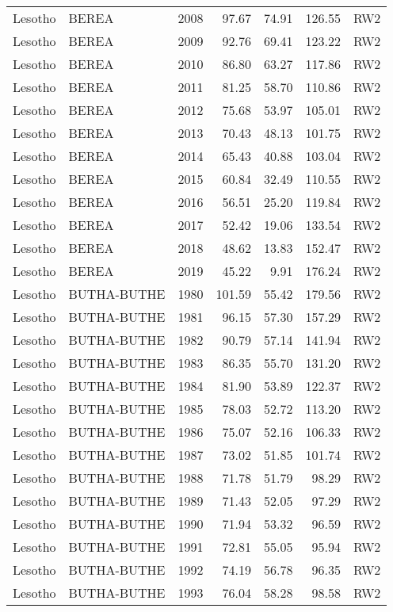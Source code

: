 \begin{longtable}{lllrrrl}
  Lesotho & BEREA & 2008 & 97.67 & 74.91 & 126.55 & RW2 \\ 
  Lesotho & BEREA & 2009 & 92.76 & 69.41 & 123.22 & RW2 \\ 
  Lesotho & BEREA & 2010 & 86.80 & 63.27 & 117.86 & RW2 \\ 
  Lesotho & BEREA & 2011 & 81.25 & 58.70 & 110.86 & RW2 \\ 
  Lesotho & BEREA & 2012 & 75.68 & 53.97 & 105.01 & RW2 \\ 
  Lesotho & BEREA & 2013 & 70.43 & 48.13 & 101.75 & RW2 \\ 
  Lesotho & BEREA & 2014 & 65.43 & 40.88 & 103.04 & RW2 \\ 
  Lesotho & BEREA & 2015 & 60.84 & 32.49 & 110.55 & RW2 \\ 
  Lesotho & BEREA & 2016 & 56.51 & 25.20 & 119.84 & RW2 \\ 
  Lesotho & BEREA & 2017 & 52.42 & 19.06 & 133.54 & RW2 \\ 
  Lesotho & BEREA & 2018 & 48.62 & 13.83 & 152.47 & RW2 \\ 
  Lesotho & BEREA & 2019 & 45.22 & 9.91 & 176.24 & RW2 \\ 
  Lesotho & BUTHA-BUTHE & 1980 & 101.59 & 55.42 & 179.56 & RW2 \\ 
  Lesotho & BUTHA-BUTHE & 1981 & 96.15 & 57.30 & 157.29 & RW2 \\ 
  Lesotho & BUTHA-BUTHE & 1982 & 90.79 & 57.14 & 141.94 & RW2 \\ 
  Lesotho & BUTHA-BUTHE & 1983 & 86.35 & 55.70 & 131.20 & RW2 \\ 
  Lesotho & BUTHA-BUTHE & 1984 & 81.90 & 53.89 & 122.37 & RW2 \\ 
  Lesotho & BUTHA-BUTHE & 1985 & 78.03 & 52.72 & 113.20 & RW2 \\ 
  Lesotho & BUTHA-BUTHE & 1986 & 75.07 & 52.16 & 106.33 & RW2 \\ 
  Lesotho & BUTHA-BUTHE & 1987 & 73.02 & 51.85 & 101.74 & RW2 \\ 
  Lesotho & BUTHA-BUTHE & 1988 & 71.78 & 51.79 & 98.29 & RW2 \\ 
  Lesotho & BUTHA-BUTHE & 1989 & 71.43 & 52.05 & 97.29 & RW2 \\ 
  Lesotho & BUTHA-BUTHE & 1990 & 71.94 & 53.32 & 96.59 & RW2 \\ 
  Lesotho & BUTHA-BUTHE & 1991 & 72.81 & 55.05 & 95.94 & RW2 \\ 
  Lesotho & BUTHA-BUTHE & 1992 & 74.19 & 56.78 & 96.35 & RW2 \\ 
  Lesotho & BUTHA-BUTHE & 1993 & 76.04 & 58.28 & 98.58 & RW2 \\ 

\end{longtable}
